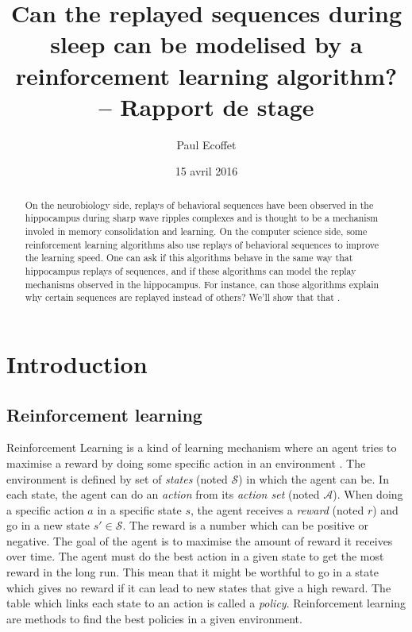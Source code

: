 \documentclass[]{article}
\title{Can the replayed sequences during sleep can be modelised by a reinforcement learning algorithm? -- Rapport de stage}
\author{Paul Ecoffet}
\date{15 avril 2016}
\newcommand\bla[1]{\ifthenelse{\isempty{#1}}{\hl{**~bla~bla~**}}{\hl{**~#1~**}}}
\begin{document}
\maketitle

\begin{abstract}
On the neurobiology side, replays of behavioral sequences have been observed in the hippocampus during sharp wave ripples complexes and is thought to be a mechanism involed in memory consolidation and learning. On the computer science side, some reinforcement learning algorithms also use replays of behavioral sequences to improve the learning speed. One can ask if this algorithms behave in the same way that hippocampus replays of sequences, and if these algorithms can model the replay mechanisms observed in the hippocampus. For instance, can those algorithms explain why certain sequences are replayed instead of others? We'll show that that \bla{we'll see}.
\end{abstract}

{
\hypersetup{linkcolor=black}
\setcounter{tocdepth}{3}
}
\section{Introduction}\label{introduction}

\subsection{Reinforcement learning}\label{reinforcement-learning}

Reinforcement Learning is a kind of learning mechanism where an agent tries to maximise a reward by doing some specific action in an environment \parencite{sutton_reinforcement_1998}. The environment is defined by set of \emph{states} (noted \(\mathcal{S}\)) in which the agent can be. In each state, the agent can do an \emph{action} from its \emph{action set} (noted \(\mathcal{A}\)). When doing a specific action \(a\) in a specific state \(s\), the agent receives a \emph{reward} (noted \(r\)) and go in a new state \(s'\in \mathcal{S}\). The reward is a number which can be positive or negative. The goal of the agent is to maximise the amount of reward it receives over time. The agent must do the best action in a given state to get the most reward in the long run. This mean that it might be worthful to go in a state which gives no reward if it can lead to new states that give a high reward. The table which links each state to an action is called a \emph{policy}. Reinforcement learning are methods to find the best policies in a given environment.
\end{document}
